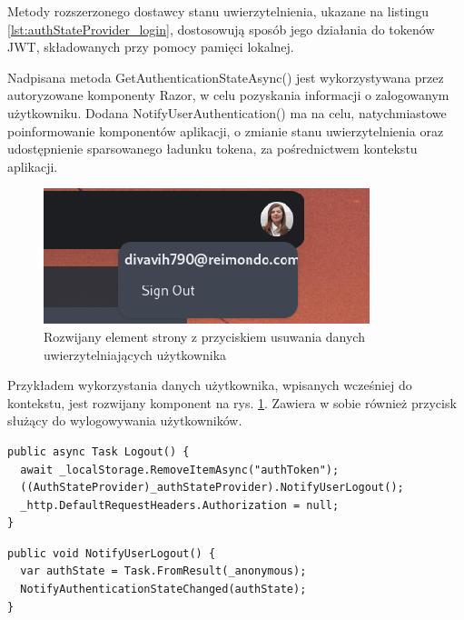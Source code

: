 Metody rozszerzonego dostawcy stanu uwierzytelnienia, ukazane na listingu \ref{lst:authStateProvider_login}, dostosowują sposób jego działania do tokenów JWT, składowanych przy pomocy pamięci lokalnej. 

Nadpisana metoda GetAuthenticationStateAsync() jest wykorzystywana przez autoryzowane komponenty Razor, w celu pozyskania informacji o zalogowanym użytkowniku. Dodana NotifyUserAuthentication() ma na celu, natychmiastowe poinformowanie komponentów aplikacji, o zmianie stanu uwierzytelnienia oraz udostępnienie sparsowanego ładunku tokena, za pośrednictwem kontekstu aplikacji.

\begin{figure}[!htbp]
\centering
\includegraphics[width=\textwidth]{img/chapter5/sign_out.png}
\caption{Rozwijany element strony z przyciskiem usuwania danych uwierzytelniających użytkownika}
\label{fig:user_dropdown}
\end{figure}

Przykładem wykorzystania danych użytkownika, wpisanych wcześniej do kontekstu, jest rozwijany komponent na rys. \ref{fig:user_dropdown}. Zawiera w sobie również przycisk służący do wylogowywania użytkowników.

\begin{lstlisting}[language=CSharp, caption={Metoda obsługująca zdarzenie wylogowania użytkownika}, label=lst:logout]
public async Task Logout() {
  await _localStorage.RemoveItemAsync("authToken");
  ((AuthStateProvider)_authStateProvider).NotifyUserLogout();
  _http.DefaultRequestHeaders.Authorization = null;
}
\end{lstlisting}

\begin{lstlisting}[language=CSharp, caption={Metoda dostawcy stanu uwierzytelnienia odpowiedzialna za usunięcie danych uwierzytelniających}, label=lst:authStateProvider_logout]
public void NotifyUserLogout() {
  var authState = Task.FromResult(_anonymous);
  NotifyAuthenticationStateChanged(authState);
}
\end{lstlisting}

